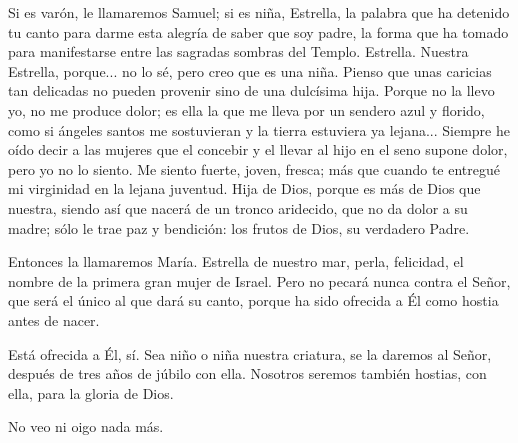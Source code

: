 \documentclass[12pt]{book} %
\begin{document}
Si es varón, le llamaremos Samuel; si es niña, Estrella, la palabra que ha detenido tu canto para darme esta alegría de saber que soy padre, la forma que ha tomado para manifestarse entre las sagradas sombras del Templo. Estrella. Nuestra Estrella, porque... no lo sé, pero creo que es una niña. Pienso que unas caricias tan delicadas no pueden provenir sino de una dulcísima hija. Porque no la llevo yo, no me produce dolor; es ella la que me lleva por un sendero azul y florido, como si ángeles santos me sostuvieran y la tierra estuviera ya lejana... Siempre he oído decir a las mujeres que el concebir y el llevar al hijo en el seno supone dolor, pero yo no lo siento. Me siento fuerte, joven, fresca; más que cuando te entregué mi virginidad en la lejana juventud. Hija de Dios, porque es más de Dios que nuestra, siendo así que nacerá de un tronco aridecido, que no da dolor a su madre; sólo le trae paz y bendición: los frutos de Dios, su verdadero Padre. 

Entonces la llamaremos María. Estrella de nuestro mar, perla, felicidad, el nombre de la primera gran mujer de Israel. Pero no pecará nunca contra el Señor, que será el único al que dará su canto, porque ha sido ofrecida a Él como hostia antes de nacer. 

Está ofrecida a Él, sí. Sea niño o niña nuestra criatura, se la daremos al Señor, después de tres años de júbilo con ella. Nosotros seremos también hostias, con ella, para la gloria de Dios. 

No veo ni oigo nada más. 
\end{document}
